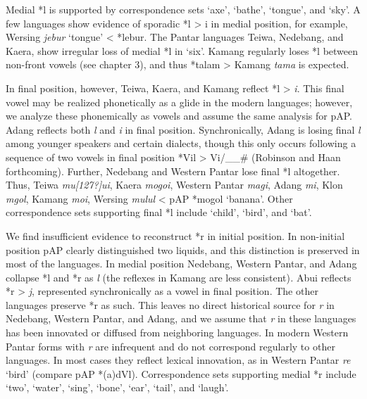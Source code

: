 Medial *l is supported by correspondence sets `axe', `bathe', `tongue', and `sky'. A few languages show evidence of sporadic *l {\textgreater} i in medial position, for example, Wersing \textit{jebur }`tongue' {\textless} *lebur. The Pantar languages Teiwa, Nedebang, and Kaera, show irregular loss of medial *l in `six'. Kamang regularly loses *l between non-front vowels (see chapter 3), and thus *talam {\textgreater} Kamang \textit{ta{\textlengthmark}ma} is expected.

In final position, however, Teiwa, Kaera, and Kamang reflect *l {\textgreater} \textit{i}. This final vowel may be realized phonetically as a glide in the modern languages; however, we analyze these phonemically as vowels and assume the same analysis for pAP. Adang reflects both \textit{l }and \textit{i} in final position. Synchronically, Adang is losing final \textit{l} among younger speakers and certain dialects, though this only occurs following a sequence of two vowels in final position *Vil {\textgreater} Vi/\_\_\# (Robinson and Haan forthcoming). Further, Nedebang and Western Pantar lose final *l altogether. Thus, Teiwa \textit{mu[127?]ui}, Kaera \textit{mogoi}, Western Pantar \textit{mag{\textlengthmark}i}, Adang \textit{m{\textopeno}}\textit{{\textglotstop}}\textit{{\textopeno}i}, Klon \textit{m{\textschwa}gol}, Kamang \textit{mo{\textlengthmark}i}, Wersing \textit{mulul }{\textless} pAP *mogol `banana'. Other correspondence sets supporting final *l include `child', `bird', and `bat'.

We find insufficient evidence to reconstruct *r in initial position. In non-initial position pAP clearly distinguished two liquids, and this distinction is preserved in most of the languages. In medial position Nedebang, Western Pantar, and Adang collapse *l and *r as \textit{l }(the reflexes in Kamang are less consistent)\textit{. }Abui reflects *r {\textgreater} \textit{j}, represented synchronically as a vowel in final position. The other languages preserve *r as such. This leaves no direct historical source for \textit{r} in Nedebang, Western Pantar, and Adang, and we assume that \textit{r }in these languages has been innovated or diffused from neighboring languages. In modern Western Pantar forms with \textit{r} are infrequent and do not correspond regularly to other languages. In most cases they reflect lexical innovation, as in Western Pantar \textit{re }`bird' (compare pAP *(a)dVl). Correspondence sets supporting medial *r include `two', `water', `sing', `bone', `ear', `tail', and `laugh'.

